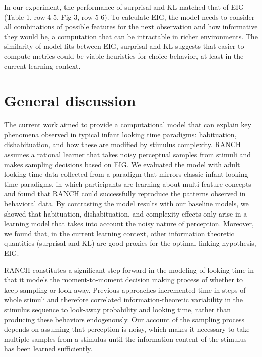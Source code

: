 \documentclass[10pt, letterpaper]{article}
\begin{document}
In our experiment, the performance of surprisal and KL matched that of
EIG (Table 1, row 4-5, Fig 3, row 5-6). To calculate EIG, the model
needs to consider all combinations of possible features for the next
observation and how informative they would be, a computation that can be
intractable in richer environments. The similarity of model fits between
EIG, surprisal and KL suggests that easier-to-compute metrics could be
viable heuristics for choice behavior, at least in the current learning
context.

\hypertarget{general-discussion}{%
\section{General discussion}\label{general-discussion}}

The current work aimed to provide a computational model that can explain
key phenomena observed in typical infant looking time paradigms:
habituation, dishabituation, and how these are modified by stimulus
complexity. RANCH assumes a rational learner that takes noisy perceptual
samples from stimuli and makes sampling decisions based on EIG. We
evaluated the model with adult looking time data collected from a
paradigm that mirrors classic infant looking time paradigms, in which
participants are learning about multi-feature concepts and found that
RANCH could successfully reproduce the patterns observed in behavioral
data. By contrasting the model results with our baseline models, we
showed that habituation, dishabituation, and complexity effects only
arise in a learning model that takes into account the noisy nature of
perception. Moreover, we found that, in the current learning context,
other information theoretic quantities (surprisal and KL) are good
proxies for the optimal linking hypothesis, EIG.

RANCH constitutes a significant step forward in the modeling of looking
time in that it models the moment-to-moment decision making process of
whether to keep sampling or look away. Previous approaches incremented
time in steps of whole stimuli and therefore correlated
information-theoretic variability in the stimulus sequence to look-away
probability and looking time, rather than producing these behaviors
endogenously. Our account of the sampling process depends on assuming
that perception is noisy, which makes it necessary to take multiple
samples from a stimulus until the information content of the stimulus
has been learned sufficiently.
\end{document}
